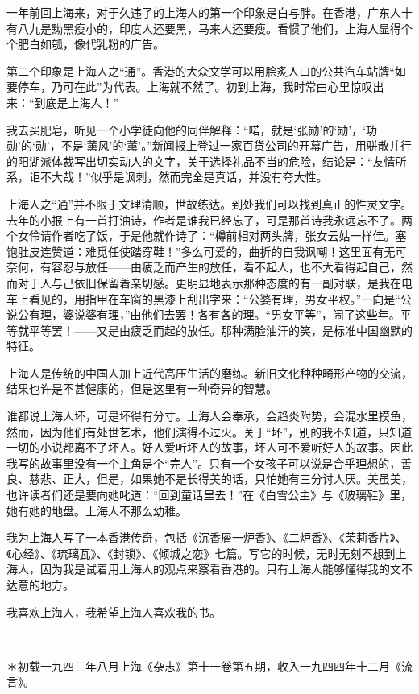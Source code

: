 \par 一年前回上海来，对于久违了的上海人的第一个印象是白与胖。在香港，广东人十有八九是黝黑瘦小的，印度人还要黑，马来人还要瘦。看惯了他们，上海人显得个个肥白如瓠，像代乳粉的广告。
\par 第二个印象是上海人之“通”。香港的大众文学可以用脍炙人口的公共汽车站牌“如要停车，乃可在此”为代表。上海就不然了。初到上海，我时常由心里惊叹出来：“到底是上海人！”
\par 我去买肥皂，听见一个小学徒向他的同伴解释：“喏，就是‘张勋’的‘勋’，‘功勋’的‘勋’，不是‘薰风’的‘薰’。”新闻报上登过一家百货公司的开幕广告，用骈散并行的阳湖派体裁写出切实动人的文字，关于选择礼品不当的危险，结论是：“友情所系，讵不大哉！”似乎是讽刺，然而完全是真话，并没有夸大性。
\par 上海人之“通”并不限于文理清顺，世故练达。到处我们可以找到真正的性灵文字。去年的小报上有一首打油诗，作者是谁我已经忘了，可是那首诗我永远忘不了。两个女伶请作者吃了饭，于是他就作诗了：“樽前相对两头牌，张女云姑一样佳。塞饱肚皮连赞道：难觅任使踏穿鞋！”多么可爱的，曲折的自我讽嘲！这里面有无可奈何，有容忍与放任——由疲乏而产生的放任，看不起人，也不大看得起自己，然而对于人与己依旧保留着亲切感。更明显地表示那种态度的有一副对联，是我在电车上看见的，用指甲在车窗的黑漆上刮出字来：“公婆有理，男女平权。”一向是“公说公有理，婆说婆有理，”由他们去罢！各有各的理。“男女平等”，闹了这些年。平等就平等罢！——又是由疲乏而起的放任。那种满脸油汗的笑，是标准中国幽默的特征。
\par 上海人是传统的中国人加上近代高压生活的磨练。新旧文化种种畸形产物的交流，结果也许是不甚健康的，但是这里有一种奇异的智慧。
\par 谁都说上海人坏，可是坏得有分寸。上海人会奉承，会趋炎附势，会混水里摸鱼，然而，因为他们有处世艺术，他们演得不过火。关于“坏”，别的我不知道，只知道一切的小说都离不了坏人。好人爱听坏人的故事，坏人可不爱听好人的故事。因此我写的故事里没有一个主角是个“完人”。只有一个女孩子可以说是合乎理想的，善良、慈悲、正大，但是，如果她不是长得美的话，只怕她有三分讨人厌。美虽美，也许读者们还是要向她叱道：“回到童话里去！”在《白雪公主》与《玻璃鞋》里，她有她的地盘。上海人不那么幼稚。
\par 我为上海人写了一本香港传奇，包括《沉香屑一炉香》、《二炉香》、《茉莉香片》、《心经》、《琉璃瓦》、《封锁》、《倾城之恋》七篇。写它的时候，无时无刻不想到上海人，因为我是试着用上海人的观点来察看香港的。只有上海人能够懂得我的文不达意的地方。
\par 我喜欢上海人，我希望上海人喜欢我的书。
\par  
\par ＊初载一九四三年八月上海《杂志》第十一卷第五期，收入一九四四年十二月《流言》。


